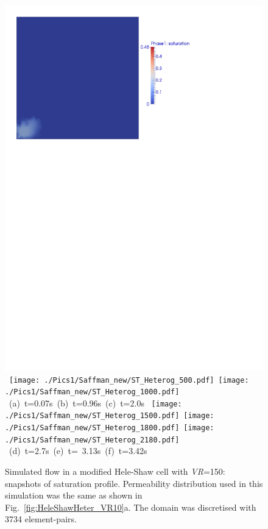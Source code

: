\begin{landscape}
  \begin{figure}[ht]
  \vbox{\vspace{-.5cm}
      \hbox{\includegraphics[width=.65\textwidth]{./Pics1/Saffman_new/ST_Heterog_50bcd.pdf} 
            \texttt{[image: ./Pics1/Saffman\_new/ST\_Heterog\_500.pdf]}
            \texttt{[image: ./Pics1/Saffman\_new/ST\_Heterog\_1000.pdf]} }
      \hbox{\hspace{2.0cm} (a) t=0.07s \hspace{6.cm} (b) t=0.96s \hspace{4.cm} (c) t=2.0s}
      \vspace{0.5cm}
      \hbox{\hspace{.5cm} \texttt{[image: ./Pics1/Saffman\_new/ST\_Heterog\_1500.pdf]}
            \texttt{[image: ./Pics1/Saffman\_new/ST\_Heterog\_1800.pdf]}
            \texttt{[image: ./Pics1/Saffman\_new/ST\_Heterog\_2180.pdf]} }
      \hbox{\hspace{3.cm} (d) t=2.7s \hspace{3.cm} (e) t= 3.13s\hspace{4.cm} (f) t=3.42s }}
\caption{Simulated flow in a modified Hele-Shaw cell with {\it VR}=150: snapshots of saturation profile. Permeability distribution used in this simulation was the same as shown in Fig.~\ref{fig:HeleShawHeter_VR10}a. The domain was discretised with 3734  element-pairs.}
\label{fig:HeleShawHeter_VR150_coarse}
\end{figure}
\end{landscape}
\clearpage



